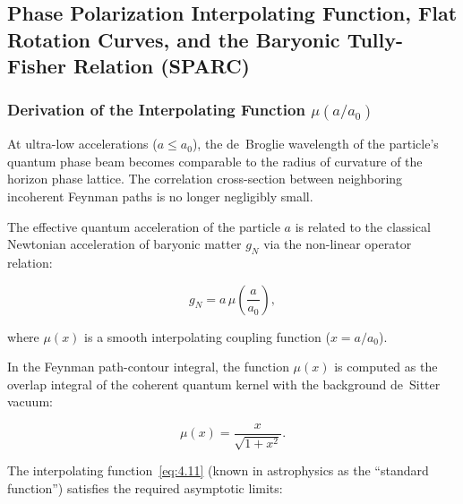 \documentclass[11pt,a4paper]{article}
\theoremstyle{definition}
\begin{document}
\subsection{Phase Polarization Interpolating Function, Flat Rotation Curves, and the Baryonic Tully-Fisher Relation (SPARC)}\label{sec:4.2}

\subsubsection{Derivation of the Interpolating Function $\mu(a/a_0)$}\label{sec:4.2.1}

At ultra-low accelerations ($a \le a_0$), the de~Broglie wavelength of the particle's quantum phase beam becomes comparable to the radius of curvature of the horizon phase lattice. The correlation cross-section between neighboring incoherent Feynman paths is no longer negligibly small.

The effective quantum acceleration of the particle $a$ is related to the classical Newtonian acceleration of baryonic matter $g_N$ via the non-linear operator relation:

\begin{equation}\label{eq:4.10}\tag{4.10}
g_N = a \, \mu\left( \frac{a}{a_0} \right),
\end{equation}

where $\mu(x)$ is a smooth interpolating coupling function ($x = a/a_0$).

In the Feynman path-contour integral, the function $\mu(x)$ is computed as the overlap integral of the coherent quantum kernel with the background de~Sitter vacuum:

\begin{equation}\label{eq:4.11}\tag{4.11}
\mu(x) = \frac{x}{\sqrt{1 + x^2}}.
\end{equation}

The interpolating function~\eqref{eq:4.11} (known in astrophysics as the ``standard function'') satisfies the required asymptotic limits:
\end{document}
